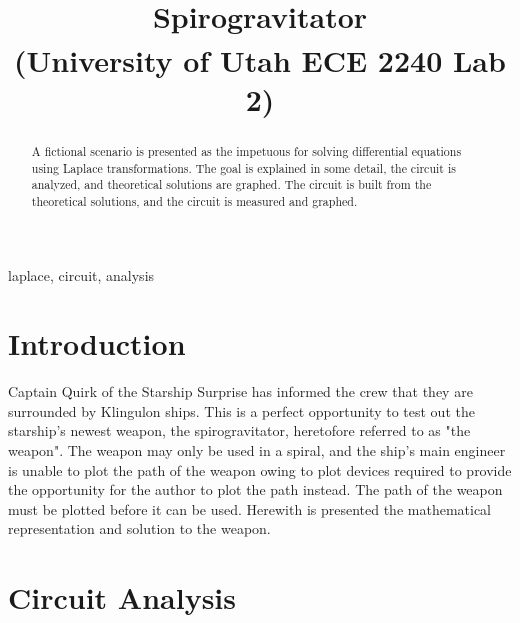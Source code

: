 \documentclass[conference]{IEEEtran}
\begin{document}
\title{Spirogravitator\\
{\footnotesize \textsuperscript{}(University of Utah ECE 2240 Lab 2)}
}

\author{
}

\maketitle

\begin{abstract}
A fictional scenario is presented as the impetuous for solving differential equations using
Laplace transformations. The goal is explained in some detail, the circuit is analyzed, and theoretical
solutions are graphed. The circuit is built from the theoretical solutions, and the circuit is measured
and graphed.
\end{abstract}

\begin{IEEEkeywords}
laplace, circuit, analysis
\end{IEEEkeywords}

\section{Introduction}
Captain Quirk of the Starship Surprise has informed the crew that they are surrounded by Klingulon ships.
This is a perfect opportunity to test out the starship's newest weapon, the spirogravitator, heretofore referred to as "the weapon".
The weapon may only be used in a spiral, and the ship's main engineer is unable to plot the path
of the weapon owing to plot devices required to provide the opportunity for the author to plot the path instead. The path of the weapon must be plotted before it can be used. Herewith is presented the mathematical representation and solution to the weapon.

\section{Circuit Analysis}\label{sec:2}
\end{document}
